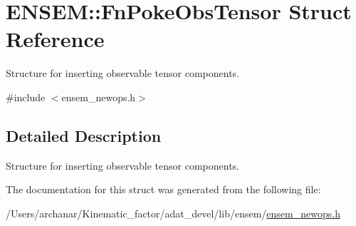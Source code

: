 \hypertarget{structENSEM_1_1FnPokeObsTensor}{}\section{E\+N\+S\+EM\+:\+:Fn\+Poke\+Obs\+Tensor Struct Reference}
\label{structENSEM_1_1FnPokeObsTensor}


Structure for inserting observable tensor components.  




{\ttfamily \#include $<$ensem\+\_\+newops.\+h$>$}



\subsection{Detailed Description}
Structure for inserting observable tensor components. 

The documentation for this struct was generated from the following file\+:\begin{DoxyCompactItemize}
\item 
/\+Users/archanar/\+Kinematic\+\_\+factor/adat\+\_\+devel/lib/ensem/\mbox{\hyperlink{lib_2ensem_2ensem__newops_8h}{ensem\+\_\+newops.\+h}}\end{DoxyCompactItemize}
